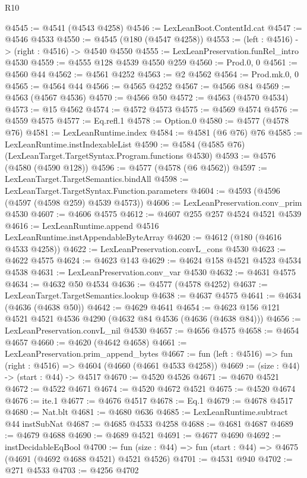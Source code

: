 \begin{lexlean}{R10}
\begin{coremodule}
{{{{{{{{{{{{{{{{{{{{{{{{{{{{{{{{{{{{{{{{{{{{{{{{{{{{{{{{{{{{{{{{{{{{{{{{{{{{{{{{{{{{{{{{{{{{{{{{{{{{{{{{{{{{@4545 := @4541 (@4543 @4258)
@4546 := LexLeanBoot.ContentId.cat
@4547 := @4546 @4533
@4550 := @4545 (@180 (@4547 @4258))
@4553 := (left : @4516) -> (right : @4516) -> @4540 @4550
@4555 := LexLeanPreservation.funRel_intro @4530
@4559 := @4555 @128 @4539 @4550 @259
@4560 := Prod.{0, 0}
@4561 := @4560 @44
@4562 := @4561 @4252
@4563 := @2 @4562
@4564 := Prod.mk.{0, 0}
@4565 := @4564 @44
@4566 := @4565 @4252
@4567 := @4566 @84
@4569 := @4563 (@4567 @4536)
@4570 := @4566 @50
@4572 := @4563 (@4570 @4534)
@4573 := @15 @4562
@4574 := @4572 @4573
@4575 := @4569 @4574
@4576 := @4559 @4575
@4577 := Eq.refl.{1}
@4578 := Option.{0}
@4580 := @4577 (@4578 @76)
@4581 := LexLeanRuntime.index
@4584 := @4581 (@6 @76) @76
@4585 := LexLeanRuntime.instIndexableList
@4590 := @4584 (@4585 @76) (LexLeanTarget.TargetSyntax.Program.functions @4530)
@4593 := @4576 (@4580 (@4590 @128))
@4596 := @4577 (@4578 (@6 @4562))
@4597 := LexLeanTarget.TargetSemantics.bindAll
@4598 := LexLeanTarget.TargetSyntax.Function.parameters
@4604 := @4593 (@4596 (@4597 (@4598 @259) @4539 @4573))
@4606 := LexLeanPreservation.conv_prim @4530
@4607 := @4606 @4575
@4612 := @4607 @255 @257 @4524 @4521 @4539
@4616 := LexLeanRuntime.append @4516 LexLeanRuntime.instAppendableByteArray
@4620 := @4612 (@180 (@4616 @4533 @4258))
@4622 := LexLeanPreservation.convL_cons @4530
@4623 := @4622 @4575
@4624 := @4623 @143
@4629 := @4624 @158 @4521 @4523 @4534 @4538
@4631 := LexLeanPreservation.conv_var @4530
@4632 := @4631 @4575
@4634 := @4632 @50 @4534
@4636 := @4577 (@4578 @4252)
@4637 := LexLeanTarget.TargetSemantics.lookup
@4638 := @4637 @4575
@4641 := @4634 (@4636 (@4638 @50))
@4642 := @4629 @4641
@4654 := @4623 @156 @121 @4521 @4521 @4536 @4290 (@4632 @84 @4536 (@4636 (@4638 @84)))
@4656 := LexLeanPreservation.convL_nil @4530
@4657 := @4656 @4575
@4658 := @4654 @4657
@4660 := @4620 (@4642 @4658)
@4661 := LexLeanPreservation.prim_append_bytes
@4667 := fun (left : @4516) => fun (right : @4516) => @4604 (@4660 (@4661 @4533 @4258))
@4669 := (size : @44) -> (start : @44) -> @4517
@4670 := @4520 @4526
@4671 := @4670 @4521
@4672 := @4522 @4671
@4674 := @4520 @4672 @4521
@4675 := @4520 @4674
@4676 := ite.{1}
@4677 := @4676 @4517
@4678 := Eq.{1}
@4679 := @4678 @4517
@4680 := Nat.blt
@4681 := @4680 @636
@4685 := LexLeanRuntime.subtract @44 instSubNat
@4687 := @4685 @4533 @4258
@4688 := @4681 @4687
@4689 := @4679 @4688
@4690 := @4689 @4521
@4691 := @4677 @4690
@4692 := instDecidableEqBool
@4700 := fun (size : @44) => fun (start : @44) => @4675 (@4691 (@4692 @4688 @4521) @4521 @4526)
@4701 := @4531 @940
@4702 := @271 @4533
@4703 := @4256 @4702
}}}}}}}}}}}}}}}}}}}}}}}}}}}}}}}}}}}}}}}}}}}}}}}}}}}}}}}}}}}}}}}}}}}}}}}}}}}}}}}}}}}}}}}}}}}}}}}}}}}}}}}}}}}}
\end{coremodule}
\end{lexlean}

